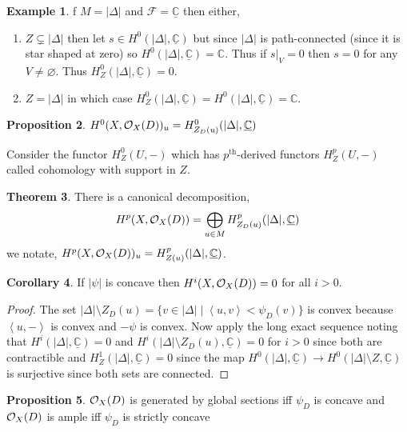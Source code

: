 \documentclass[12pt]{extarticle}
\newcommand{\C}{\mathbb{C}}
\theoremstyle{definition}
\newtheorem{theorem}{Theorem}[section]
\newtheorem{proposition}[theorem]{Proposition}
\newtheorem{example}[theorem]{Example}
\newtheorem{corollary}[theorem]{Corollary}
\newenvironment{definition}[1][Definition:]{\begin{trivlist}
\item[\hskip \labelsep {\bfseries #1}]}{\end{trivlist}}
\newcommand{\F}{\mathcal{F}}
\newcommand{\inner}[2]{\left< #1, #2 \right>}
\begin{document}
\begin{example}
f $M = |\Delta|$ and $\F = \underline{\C}$ then either,
\begin{enumerate}
\item $Z \subsetneq |\Delta|$ then let $s \in H^0(|\Delta|, \underline{\C})$ but since $|\Delta|$ is path-connected (since it is star shaped at zero) so $H^0(|\Delta|, \underline{\C}) = \C$. Thus if $s|_V = 0$ then $s = 0$ for any $V \neq \varnothing$. Thus $H_Z^0(|\Delta|, \underline{\C}) = 0$.
\item $Z = |\Delta|$ in which case $H_Z^0(|\Delta|, \underline{\C}) = H^0(|\Delta|, \underline{\C}) = \C$. 
\end{enumerate}
\end{example}

\begin{proposition}
$H^0(X, \struct{X}(D))_u = H^0_{Z_D(u)}(|\Delta|, \underline{\C})$ 
\end{proposition}

\begin{definition}
Consider the functor $H^0_Z(U, -)$ which has $p^{\text{th}}$-derived functors $H_Z^p(U, -)$ called cohomology with support in $Z$. 
\end{definition}

\begin{theorem}
There is a canonical decomposition,
\[ H^p(X, \struct{X}(D)) = \bigoplus_{u \in M} H^p_{Z_D(u)}(|\Delta|, \underline{\C}) \]
we notate, $H^p(X, \struct{X}(D))_u = H^p_{Z(u)}(|\Delta|, \underline{\C})$.
\end{theorem}

\begin{corollary}
If $|\psi|$ is concave then $H^i(X, \mathcal{O}_{X}(D)) = 0$ for all $i > 0$. 
\end{corollary}

\begin{proof}
The set $|\Delta| \setminus Z_D(u) = \{ v \in |\Delta| \mid \inner{u}{v} < \psi_D(v) \}$ is convex because $\inner{u}{-}$ is convex and $-\psi$ is convex. Now apply the long exact sequence noting that $H^i(|\Delta|, \underline{\C}) = 0$ and $H^i(|\Delta| \setminus Z_D(u), \underline{\C}) = 0$ for $i > 0$ since both are contractible and $H^1_Z(|\Delta|, \underline{\C}) = 0$ since the map $H^0(|\Delta|, \underline{\C}) \to H^0(|\Delta| \setminus Z, \underline{\C})$ is surjective since both sets are connected. 
\end{proof}

\begin{proposition}
$\mathcal{O}_{X}(D)$ is generated by global sections iff $\psi_D$ is concave and $\mathcal{O}_{X}(D)$ is ample iff $\psi_D$ is strictly concave
\end{proposition}
\end{document}
